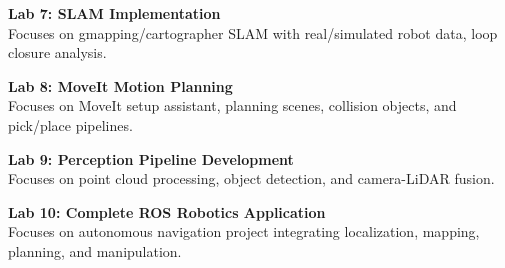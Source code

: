 \vspace{0.2cm}

\noindent\textbf{Lab 7: SLAM Implementation} \\
Focuses on gmapping/cartographer SLAM with real/simulated robot data, loop closure analysis.

\vspace{0.2cm}

\noindent\textbf{Lab 8: MoveIt Motion Planning} \\
Focuses on MoveIt setup assistant, planning scenes, collision objects, and pick/place pipelines.

\vspace{0.2cm}

\noindent\textbf{Lab 9: Perception Pipeline Development} \\
Focuses on point cloud processing, object detection, and camera-LiDAR fusion.

\vspace{0.2cm}

\noindent\textbf{Lab 10: Complete ROS Robotics Application} \\
Focuses on autonomous navigation project integrating localization, mapping, planning, and manipulation.

\vspace{0.2cm}

\newpage
{}
